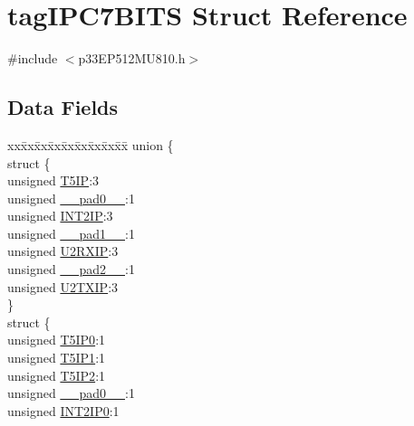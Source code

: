 \hypertarget{structtag_i_p_c7_b_i_t_s}{}\section{tag\+I\+P\+C7\+B\+I\+TS Struct Reference}
\label{structtag_i_p_c7_b_i_t_s}


{\ttfamily \#include $<$p33\+E\+P512\+M\+U810.\+h$>$}

\subsection*{Data Fields}
\begin{DoxyCompactItemize}
\item 
\begin{tabbing}
xx\=xx\=xx\=xx\=xx\=xx\=xx\=xx\=xx\=\kill
union \{\\
\>struct \{\\
\>\>unsigned \hyperlink{structtag_i_p_c7_b_i_t_s_a56b1ca052aa7bcecd9df80d383c56828}{T5IP}:3\\
\>\>unsigned \hyperlink{structtag_i_p_c7_b_i_t_s_adf71f3d8410c1f1dbbc96680a92c49af}{\_\_pad0\_\_}:1\\
\>\>unsigned \hyperlink{structtag_i_p_c7_b_i_t_s_a54b3cc4eb3b5d69a4cfb9f1af484de11}{INT2IP}:3\\
\>\>unsigned \hyperlink{structtag_i_p_c7_b_i_t_s_acaf2d0924a107ec6e8d2e31febaf66f9}{\_\_pad1\_\_}:1\\
\>\>unsigned \hyperlink{structtag_i_p_c7_b_i_t_s_a00369595ed8b8e3f1fa912d7a1ebc12a}{U2RXIP}:3\\
\>\>unsigned \hyperlink{structtag_i_p_c7_b_i_t_s_a4d97cc5f7d51d22fc2bf3eab35c9cb7f}{\_\_pad2\_\_}:1\\
\>\>unsigned \hyperlink{structtag_i_p_c7_b_i_t_s_a9f56a53af1d5d98a79f65abe9391de0a}{U2TXIP}:3\\
\>\} \\
\>struct \{\\
\>\>unsigned \hyperlink{structtag_i_p_c7_b_i_t_s_ad594320d332d8b03f8ffed1b3083badf}{T5IP0}:1\\
\>\>unsigned \hyperlink{structtag_i_p_c7_b_i_t_s_afa4949368e94fdb7a82f3abb4866fd9d}{T5IP1}:1\\
\>\>unsigned \hyperlink{structtag_i_p_c7_b_i_t_s_a6c5cb8c00b46c5e3e0438813ec516e74}{T5IP2}:1\\
\>\>unsigned \hyperlink{structtag_i_p_c7_b_i_t_s_adf71f3d8410c1f1dbbc96680a92c49af}{\_\_pad0\_\_}:1\\
\>\>unsigned \hyperlink{structtag_i_p_c7_b_i_t_s_afa431cdda30b10676fcddf8dce1a3d57}{INT2IP0}:1\\

\end{tabbing}
\end{DoxyCompactItemize}
